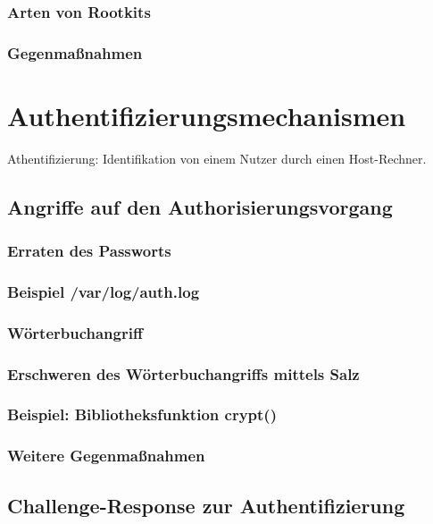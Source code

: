 \subsubsection*{Arten von Rootkits}
\subsubsection*{Gegenmaßnahmen}

\section{Authentifizierungsmechanismen}
Athentifizierung: Identifikation von einem Nutzer durch einen Host-Rechner.

\subsection{Angriffe auf den Authorisierungsvorgang}
\subsubsection{Erraten des Passworts}
\subsubsection*{Beispiel /var/log/auth.log}
\subsubsection{Wörterbuchangriff}
\subsubsection{Erschweren des Wörterbuchangriffs mittels Salz}
\subsubsection*{Beispiel: Bibliotheksfunktion crypt()}
\subsubsection*{Weitere Gegenmaßnahmen}

\subsection{Challenge-Response zur Authentifizierung}

